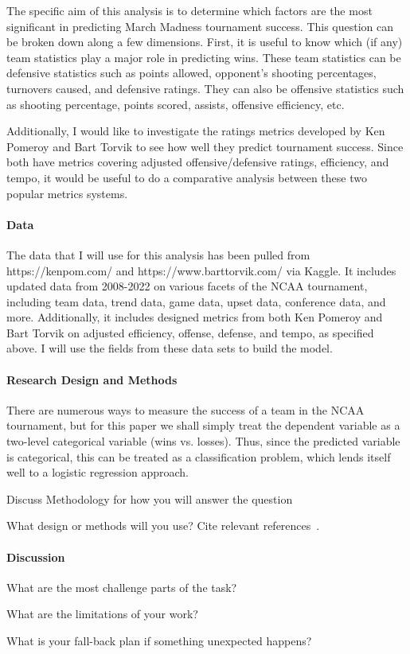 \documentclass[12pt]{article}
\begin{document}
The specific aim of this analysis is to determine which factors are the most significant in predicting March Madness tournament success.  This question can be broken down along a few dimensions.  First, it is useful to know which (if any) team statistics play a major role in predicting wins.  These team statistics can be defensive statistics such as points allowed, opponent's shooting percentages, turnovers caused, and defensive ratings.  They can also be offensive statistics such as shooting percentage, points scored, assists, offensive efficiency, etc.  

Additionally, I would like to investigate the ratings metrics developed by Ken Pomeroy and Bart Torvik to see how well they predict tournament success.  Since both have metrics covering adjusted offensive/defensive ratings, efficiency, and tempo, it would be useful to do a comparative analysis between these two popular metrics systems.  

\paragraph{Data}

The data that I will use for this analysis has been pulled from https://kenpom.com/ and https://www.barttorvik.com/ via Kaggle.  It includes updated data from 2008-2022 on various facets of the NCAA tournament, including team data, trend data, game data, upset data, conference data, and more.  Additionally, it includes designed metrics from both Ken Pomeroy and Bart Torvik on adjusted efficiency, offense, defense, and tempo, as specified above.  I will use the fields from these data sets to build the model.  

\paragraph{Research Design and Methods}

There are numerous ways to measure the success of a team in the NCAA tournament, but for this paper we shall simply treat the dependent variable as a two-level categorical variable (wins vs. losses).  Thus, since the predicted variable is categorical, this can be treated as a classification problem, which lends itself well to a logistic regression approach.  

Discuss Methodology for how you will answer the question

What design or methods will you use?
Cite relevant references~\citep[e.g.,][]{wild2004global}.

\paragraph{Discussion}
What are the most challenge parts of the task?

What are the limitations of your work?

What is your fall-back plan if
something unexpected happens?



\end{document}
